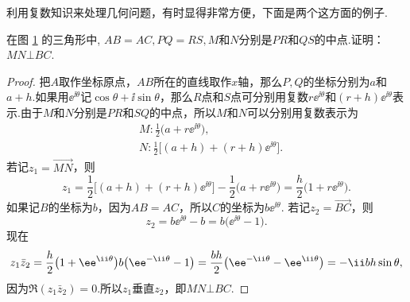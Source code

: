 利用复数知识来处理几何问题，有时显得非常方便，下面是两个这方面的例子.
\begin{example}
在图 \ref{fig1.3} 的三角形中, $AB=AC,PQ=RS,M$和$N$分别是$PR$和$QS$的中点.证明： $MN\bot BC$.
\end{example}
\begin{figure}[!ht]
\centering
{}
\caption{}\label{fig1.3}
\end{figure}
\begin{proof}
把$A$取作坐标原点，$AB$所在的直线取作$x$轴，那么$P,Q$的坐标分别为$a$和$a+h$.如果用$\ee^{\ii\theta} $记$\cos\theta+\ii\sin\theta$，那么$R$点和$S$点可分别用复数$r\ee^{\ii\theta}$和$(r+h)\ee^{\ii\theta}$表示.由于$M$和$N$分别是$PR$和$SQ$的中点，所以$M$和$N$可以分别用复数表示为
\begin{align*}
  &M:\frac12\big(a+r\ee^{\ii\theta}\big),\\
  &N:\frac12\big[(a+h)+(r+h)\ee^{\ii\theta}\big].
\end{align*}
若记$z_1=\overrightarrow{MN}$，则
\[z_1=\frac12\big[(a+h)+(r+h)\ee^{\ii\theta}\big]-\frac12\big(a+r\ee^{\ii\theta}\big)=\frac h2\big(1+r\ee^{\ii\theta}\big).\]
如果记$B$的坐标为$b$，因为$AB=AC$，所以$C$的坐标为$b\ee^{\ii\theta}$. 若记$z_2=\overrightarrow{BC}$，则
\[z_2=b\ee^{\ii\theta}-b=b\big(\ee^{\ii\theta}-1\big).\]
现在
\[
z_1\bar z_2=\frac h2\big(1+\ee^{\ii\theta}\big)b\big(\ee^{-\ii\theta}-1\big)\\
=\frac{bh}2\big(\ee^{-\ii\theta}-\ee^{\ii\theta}\big)=-\ii bh\sin\theta,
\]
因为$\Re(z_1\bar z_2)=0$.所以$z_1$垂直$z_2$，即$MN\bot BC$.
\end{proof}

